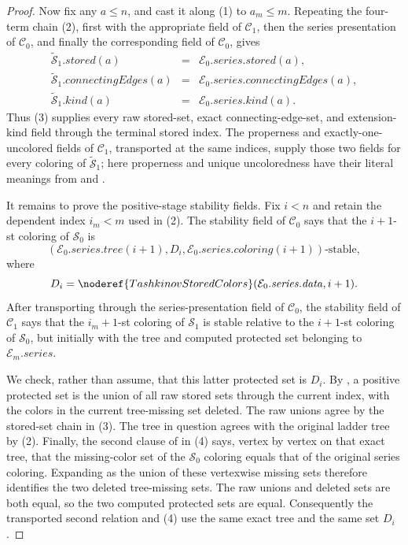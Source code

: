 \begin{proof}
Now fix any \(a\leq n\), and cast it along (1) to \(a_m\leq m\).  Repeating
the four-term chain (2), first with the appropriate field of
\(\mathcal C_1\), then the series presentation of \(\mathcal C_0\), and
finally the corresponding field of \(\mathcal C_0\), gives
\[
\begin{array}{rcl}
 \widetilde{\mathcal S}_1.\mathit{stored}(a)
  &=&\mathcal E_0.\mathit{series}.\mathit{stored}(a),\\
 \widetilde{\mathcal S}_1.\mathit{connectingEdges}(a)
  &=&\mathcal E_0.\mathit{series}.\mathit{connectingEdges}(a),\\
 \widetilde{\mathcal S}_1.\mathit{kind}(a)
  &=&\mathcal E_0.\mathit{series}.\mathit{kind}(a).
\end{array}                                                     \tag{3}
\]
Thus (3) supplies every raw stored-set, exact connecting-edge-set, and
extension-kind field through the terminal stored index.  The properness
and exactly-one-uncolored fields of \(\mathcal C_1\), transported at the
same indices, supply those two fields for every coloring of
\(\widetilde{\mathcal S}_1\); here properness and unique uncoloredness have
their literal meanings from  and
.

It remains to prove the positive-stage stability fields.  Fix \(i<n\) and
retain the dependent index \(i_m<m\) used in (2).  The stability field of
\(\mathcal C_0\) says that the \(i+1\)-st coloring of \(\mathcal S_0\) is
\[
 (\mathcal E_0.\mathit{series}.\mathit{tree}(i+1),
  D_i,\mathcal E_0.\mathit{series}.\mathit{coloring}(i+1))
 \text{-stable},                                               \tag{4}
\]
where
\[
 D_i=\noderef{TashkinovStoredColors}
       (\mathcal E_0.\mathit{series}.\mathit{data},i+1).
\]
After transporting through the series-presentation field of
\(\mathcal C_0\), the stability field of \(\mathcal C_1\) says that the
\(i_m+1\)-st coloring of \(\mathcal S_1\) is stable relative to the
\(i+1\)-st coloring of \(\mathcal S_0\), but initially with the tree and
computed protected set belonging to \(\mathcal E_m.\mathit{series}\).

We check, rather than assume, that this latter protected set is \(D_i\).
By , a positive protected set is the union
of all raw stored sets through the current index, with the colors in the
current tree-missing set deleted.  The raw unions agree by the stored-set
chain in (3).  The tree in question agrees with the original ladder tree
by (2).  Finally, the second clause of
 in (4) says, vertex by vertex on that exact tree,
that the missing-color set of the \(\mathcal S_0\) coloring equals that of
the original series coloring.  Expanding
 as the union of these vertexwise missing sets
therefore identifies the two deleted tree-missing sets.  The raw unions
and deleted sets are both equal, so the two computed protected sets are
equal.  Consequently the transported second relation and (4) use the
same exact tree and the same set \(D_i\).


\end{proof}
